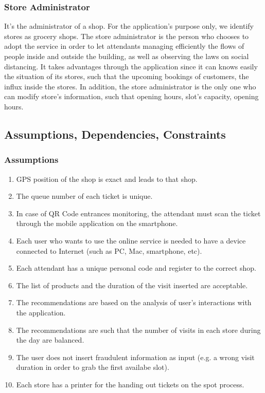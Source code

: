 \documentclass[table, 12pt]{article}
\begin{document}
\begin{flushleft}
    \subsubsection{Store Administrator}
    It's the administrator of a shop. For the application's purpose only, we identify stores as grocery shops. The store administrator is the person who chooses to adopt the service in order to let attendants managing efficiently the flows of people inside and outside the building, as well as observing the laws on social distancing. It takes advantages through the application since it can knows easily the situation of its stores, such that the upcoming bookings of customers, the influx inside the stores. In addition, the store administrator is the only one who can modify store's information, such that opening hours, slot's capacity, opening hours.

    \subsection{Assumptions, Dependencies, Constraints}
    \subsubsection{Assumptions}
    \begin{enumerate}[label=\textbf{D\arabic*}:]
        \item GPS position of the shop is exact and leads to that shop.
        \item The queue number of each ticket is unique.
        \item In case of QR Code entrances monitoring, the attendant must scan the ticket through the mobile application on the smartphone.
        \item Each user who wants to use the online service is needed to have a device connected to Internet (such as PC, Mac, smartphone, etc).
        \item Each attendant has a unique personal code and register to the correct shop.
        \item The list of products and the duration of the visit inserted are acceptable.
        \item The recommendations are based on the analysis of user's interactions with the application.
        \item The recommendations are such that the number of visits in each store during the day are balanced.
        \item The user does not insert fraudulent information as input (e.g. a wrong visit duration in order to grab the first availabe slot).
        \item Each store has a printer for the handing out tickets on the spot process.
    \end{enumerate}


\end{flushleft}
\end{document}

